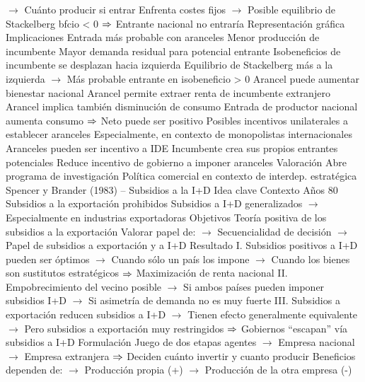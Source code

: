 \documentclass{nuevotema}
\begin{document}
\begin{esquemal}
				\4[] $\to$ Cuánto producir si entrar
				\4[] Enfrenta costes fijos
				\4[] $\to$ Posible equilibrio de Stackelberg bfcio < 0
				\4[] $\Rightarrow$ Entrante nacional no entraría
				\4 Representación gráfica
				\4[] 
			\3 Implicaciones
				\4 Entrada más probable con aranceles
				\4[] Menor producción de incumbente
				\4[] Mayor demanda residual para potencial entrante
				\4[] Isobeneficios de incumbente se desplazan hacia izquierda
				\4[] Equilibrio de Stackelberg más a la izquierda
				\4[] $\to$ Más probable entrante en isobeneficio > 0
				\4 Arancel puede aumentar bienestar nacional
				\4[] Arancel permite extraer renta de incumbente extranjero
				\4[] Arancel implica también disminución de consumo
				\4[] Entrada de productor nacional aumenta consumo
				\4[] $\Rightarrow$ Neto puede ser positivo
				\4 Posibles incentivos unilaterales a establecer aranceles
				\4[] Especialmente, en contexto de monopolistas internacionales
				\4 Aranceles pueden ser incentivo a IDE
				\4[] Incumbente crea sus propios entrantes potenciales
				\4[] Reduce incentivo de gobierno a imponer aranceles
			\3 Valoración
				\4 Abre programa de investigación
				\4[] Política comercial en contexto de interdep. estratégica
		\2 Spencer y Brander (1983) -- Subsidios a la I+D
			\3 Idea clave
				\4 Contexto
				\4[] Años 80
				\4[] Subsidios a la exportación prohibidos
				\4[] Subsidios a I+D generalizados
				\4[] $\to$ Especialmente en industrias exportadoras
				\4 Objetivos
				\4[] Teoría positiva de los subsidios a la exportación
				\4[] Valorar papel de:
				\4[] $\to$ Secuencialidad de decisión
				\4[] $\to$ Papel de subsidios a exportación y a I+D
				\4 Resultado
				\4[] I. Subsidios positivos a I+D pueden ser óptimos
				\4[] $\to$ Cuando sólo un país los impone
				\4[] $\to$ Cuando los bienes son sustitutos estratégicos
				\4[] $\Rightarrow$ Maximización de renta nacional
				\4[] II. Empobrecimiento del vecino posible
				\4[] $\to$ Si ambos países pueden imponer subsidios I+D
				\4[] $\to$ Si asimetría de demanda no es muy fuerte
				\4[] III. Subsidios a exportación reducen subsidios a I+D
				\4[] $\to$ Tienen efecto generalmente equivalente
				\4[] $\to$ Pero subsidios a exportación muy restringidos
				\4[] $\Rightarrow$ Gobiernos ``escapan'' vía subsidios a I+D
			\3 Formulación
				\4 Juego de dos etapas
				 agentes
				\4[] $\to$ Empresa nacional
				\4[] $\to$ Empresa extranjera
				\4[] $\Rightarrow$ Deciden cuánto invertir y cuanto producir
				\4[] Beneficios dependen de:
				\4[] $\to$ Producción propia (+)
				\4[] $\to$ Producción de la otra empresa (-)

\end{esquemal}
\end{document}
